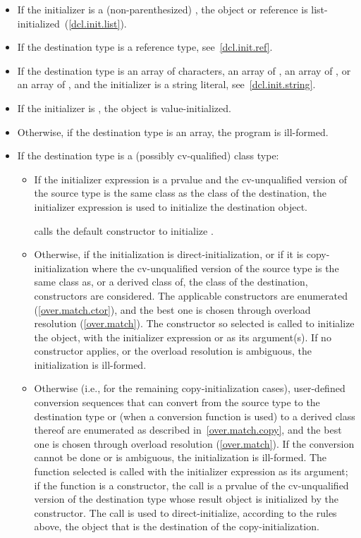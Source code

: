 \begin{itemize}
\item
If the initializer is a (non-parenthesized) , the object or reference
is list-initialized~(\ref{dcl.init.list}).
\item
If the destination type is a reference type, see~\ref{dcl.init.ref}.
\item
If the destination type is an array of characters,
an array of ,
an array of ,
or an array of
,
and the initializer is a string literal, see~\ref{dcl.init.string}.
\item If the initializer is \tcode{()}, the object is value-initialized.
\item
Otherwise, if the destination type is an array, the program is ill-formed.
\item
If the destination type is a (possibly cv-qualified) class type:

\begin{itemize}
\item
If the initializer expression is a prvalue
and the cv-unqualified version of the source type
is the same class as the class of the destination,
the initializer expression is used to initialize the destination object.
\begin{example}
 calls the  default constructor to initialize .
\end{example}
\item
Otherwise, if the initialization is direct-initialization,
or if it is copy-initialization where the cv-unqualified version of the source
type is the same class as, or a derived class of, the class of the destination,
constructors are considered.
The applicable constructors
are enumerated (\ref{over.match.ctor}), and the best one is chosen
through overload resolution (\ref{over.match}).
The constructor so selected
is called to initialize the object, with the initializer
expression or  as its argument(s).
If no constructor applies, or the overload resolution is
ambiguous, the initialization is ill-formed.
\item
Otherwise (i.e., for the remaining copy-initialization cases),
user-defined conversion sequences that can convert from the
source type to the destination type or (when a conversion function
is used) to a derived class thereof are enumerated as described in~\ref{over.match.copy}, and the best one is chosen through overload
resolution (\ref{over.match}).  If the conversion cannot be done or
is ambiguous, the initialization is ill-formed.  The function
selected is called with the initializer expression as its
argument; if the function is a constructor, the call is a prvalue
of the cv-unqualified version of the
destination type whose result object is initialized by the constructor.
The call is used
to direct-initialize, according to the rules above, the object
that is the destination of the copy-initialization.
\end{itemize}


\end{itemize}
